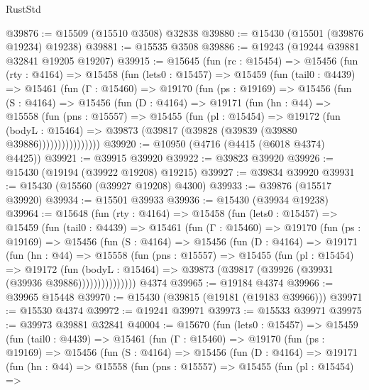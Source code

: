 \begin{lexlean}{RustStd}
\begin{coremodule}
{\begin{coremodule}
{{{{{{{{{{{{{{{{{{{{{{{{{{{{{{{{{{{{{{{{{{{{{{{{{{{{{{{{{{{{@39876 := @15509 (@15510 @3508) @32838
@39880 := @15430 (@15501 (@39876 @19234) @19238)
@39881 := @15535 @3508
@39886 := @19243 (@19244 @39881 @32841 @19205 @19207)
@39915 := @15645
    (fun (rc : @15454) =>
    @15456
      (fun (rty : @4164) =>
      @15458
        (fun (lets0 : @15457) =>
        @15459
          (fun (tail0 : @4439) =>
          @15461
            (fun (Γ : @15460) =>
            @19170
              (fun (ps : @19169) =>
              @15456
                (fun (S : @4164) =>
                @15456
                  (fun (D : @4164) =>
                  @19171
                    (fun (hn : @44) =>
                    @15558
                      (fun (pns : @15557) =>
                      @15455
                        (fun (pl : @15454) =>
                        @19172
                          (fun (bodyL : @15464) =>
                          @39873 (@39817 (@39828 (@39839 (@39880 @39886))))))))))))))))
@39920 := @10950 (@4716 (@4415 (@6018 @4374) @4425))
@39921 := @39915 @39920
@39922 := @39823 @39920
@39926 := @15430 (@19194 (@39922 @19208) @19215)
@39927 := @39834 @39920
@39931 := @15430 (@15560 (@39927 @19208) @4300)
@39933 := @39876 (@15517 @39920)
@39934 := @15501 @39933
@39936 := @15430 (@39934 @19238)
@39964 := @15648
    (fun (rty : @4164) =>
    @15458
      (fun (lets0 : @15457) =>
      @15459
        (fun (tail0 : @4439) =>
        @15461
          (fun (Γ : @15460) =>
          @19170
            (fun (ps : @19169) =>
            @15456
              (fun (S : @4164) =>
              @15456
                (fun (D : @4164) =>
                @19171
                  (fun (hn : @44) =>
                  @15558
                    (fun (pns : @15557) =>
                    @15455
                      (fun (pl : @15454) =>
                      @19172
                        (fun (bodyL : @15464) =>
                        @39873 (@39817 (@39926 (@39931 (@39936 @39886)))))))))))))))
    @4374
@39965 := @19184 @4374
@39966 := @39965 @15448
@39970 := @15430 (@39815 (@19181 (@19183 @39966)))
@39971 := @15530 @4374
@39972 := @19241 @39971
@39973 := @15533 @39971
@39975 := @39973 @39881 @32841
@40004 := @15670
    (fun (lets0 : @15457) =>
    @15459
      (fun (tail0 : @4439) =>
      @15461
        (fun (Γ : @15460) =>
        @19170
          (fun (ps : @19169) =>
          @15456
            (fun (S : @4164) =>
            @15456
              (fun (D : @4164) =>
              @19171
                (fun (hn : @44) =>
                @15558
                  (fun (pns : @15557) =>
                  @15455
                    (fun (pl : @15454) =>
}}}}}}}}}}}}}}}}}}}}}}}}}}}}}}}}}}}}}}}}}}}}}}}}}}}}}}}}}}}}
\end{coremodule}}
\end{coremodule}
\end{lexlean}
